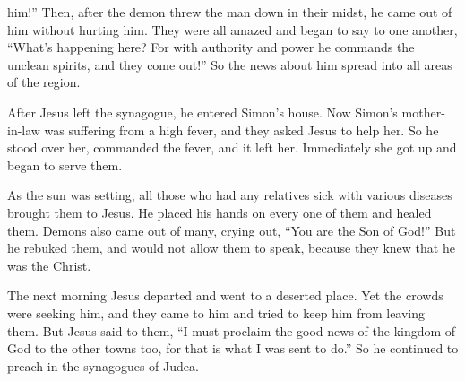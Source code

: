 {him!” Then,
after
the demon
threw
the man
down
in
their midst,
he came out
of
him
without
hurting
him.
They were
all
amazed
and
began to say
to
one another,
“What’s
happening
here? For
with
authority
and
power
he commands
the unclean
spirits,
and
they come out!”
So
the news
about
him
spread
into
all
areas
of the region.
\par }{\PP {}After
Jesus left
the synagogue,
he entered
Simon’s
house.
Now
Simon’s
mother-in-law
was
suffering from
a high
fever,
and
they asked
Jesus
to help
her.
So
he stood
over
her,
commanded
the fever,
and
it left
her.
Immediately
she got up
and
began to serve
them.
\par }{\PP {}As the sun
was setting, all those
who had
any relatives sick
with various
diseases
brought
them
to
Jesus.
He placed
his hands
on every one
of them
and healed
them.
Demons
also
came out
of
many,
crying out, “You
are
the Son
of God!” But
he rebuked
them, and would
not
allow
them
to speak,
because
they knew
that he
was
the Christ.
\par }{\PP {}The next morning
Jesus departed
and went
to
a deserted
place.
Yet
the crowds
were seeking
him,
and
they came
to
him
and
tried to keep
him
from
leaving
them.
But
Jesus said
to
them,
“I
must
proclaim the good news
of the kingdom
of God
to the other
towns
too,
for
that
is what I was sent to do.”
So
he continued
to preach
in
the synagogues
of Judea.

}
